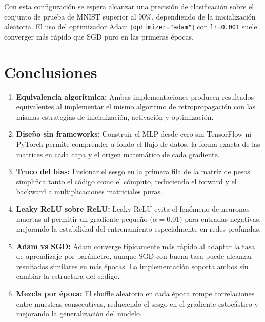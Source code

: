 Con esta configuración se espera alcanzar una precisión de clasificación sobre el conjunto
de prueba de MNIST superior al $90\%$, dependiendo de la inicialización aleatoria. El uso
del optimizador Adam (\texttt{optimizer="adam"}) con \texttt{lr=0.001} suele converger más
rápido que SGD puro en las primeras épocas.

\section{Conclusiones}

\begin{enumerate}
    \item \textbf{Equivalencia algorítmica:} Ambas implementaciones producen resultados
    equivalentes al implementar el mismo algoritmo de retropropagación con las mismas
    estrategias de inicialización, activación y optimización.

    \item \textbf{Diseño sin frameworks:} Construir el MLP desde cero sin TensorFlow ni
    PyTorch permite comprender a fondo el flujo de datos, la forma exacta de las matrices
    en cada capa y el origen matemático de cada gradiente.

    \item \textbf{Truco del bias:} Fusionar el sesgo en la primera fila de la matriz de
    pesos simplifica tanto el código como el cómputo, reduciendo el forward y el backward
    a multiplicaciones matriciales puras.

    \item \textbf{Leaky ReLU sobre ReLU:} Leaky ReLU evita el fenómeno de neuronas muertas
    al permitir un gradiente pequeño ($\alpha=0.01$) para entradas negativas, mejorando la
    estabilidad del entrenamiento especialmente en redes profundas.

    \item \textbf{Adam vs SGD:} Adam converge típicamente más rápido al adaptar la tasa de
    aprendizaje por parámetro, aunque SGD con buena tasa puede alcanzar resultados similares
    en más épocas. La implementación soporta ambos sin cambiar la estructura del código.

    \item \textbf{Mezcla por época:} El shuffle aleatorio en cada época rompe correlaciones
    entre muestras consecutivas, reduciendo el sesgo en el gradiente estocástico y mejorando
    la generalización del modelo.
\end{enumerate}

